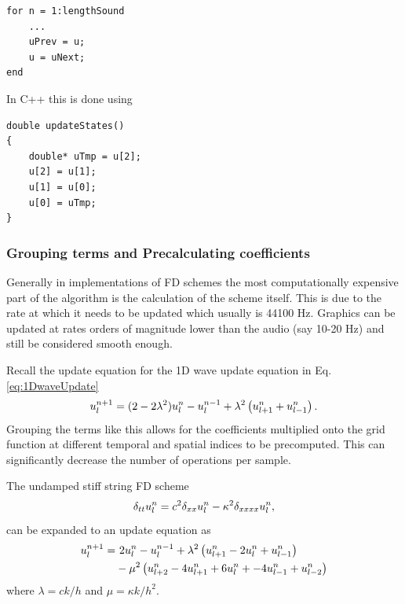 \setlstMAT
\begin{lstlisting}
for n = 1:lengthSound
    ...
    uPrev = u;
    u = uNext;
end
\end{lstlisting}



In C++ this is done using
\setlstCpp
\begin{lstlisting}[caption=Implementation of a pointer switch also shown in Figure \ref{fig:pointerSwitch}. A temporary pointer is assigned to where the $\u^{n-1}$ pointer is currently pointing at to be able to assign that location in memory to the $\u^{n+1}$ pointer in the end., label=lst:cppPointer]
double updateStates()
{
    double* uTmp = u[2];
    u[2] = u[1];
    u[1] = u[0];
    u[0] = uTmp;
}
\end{lstlisting}

\pagebreak
\subsubsection{Grouping terms and Precalculating coefficients}
Generally in implementations of FD schemes the most computationally expensive part of the algorithm is the calculation of the scheme itself. This is due to the rate at which it needs to be updated which usually is 44100 Hz. Graphics can be updated at rates orders of magnitude lower than the audio (say 10-20 Hz) and still be considered smooth enough.

Recall the update equation for the 1D wave update equation in Eq. \eqref{eq:1DwaveUpdate}
\begin{equation*}
    u_l^{n+1} = (2 - 2 \lambda^2) u_l^n - u_l^{n-1} + \lambda^2\left(u_{l+1}^n + u_{l-1}^n\right).
\end{equation*}
Grouping the terms like this allows for the coefficients multiplied onto the grid function at different temporal and spatial indices to be precomputed. This can significantly decrease the number of operations per sample.

The undamped stiff string FD scheme%
\begin{equation}
    \delta_{tt} u_l^n = c^2 \delta_{xx} u_l^n - \kappa^2 \delta_{xxxx} u_l^n,
\end{equation}
can be expanded to an update equation as
\begin{equation}
    \begin{aligned}
        u_l^{n+1} = &\ 2u_l^n - u_l^{n-1} + \lambda^2 \left(u_{l+1}^n - 2u_l^n + u_{l-1}^n\right)\\
        & - \mu^2 \left(u_{l+2}^n - 4u_{l+1}^n + 6u_l^n + -4u_{l-1}^n + u_{l-2}^n\right)
    \end{aligned}
\end{equation}
where $\lambda = ck/h$ and $\mu = \kappa k / h^2$.

